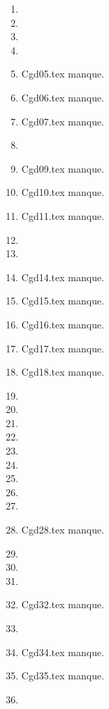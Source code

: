\clearpage 
{}
\begin{enumerate}
  \item  
  \item  
  \item  
  \item  
  \item Cgd05.tex manque. 
  \item Cgd06.tex manque. 
  \item Cgd07.tex manque. 
  \item  
  \item Cgd09.tex manque. 
  \item Cgd10.tex manque. 
  \item Cgd11.tex manque. 
  \item  
  \item  
  \item Cgd14.tex manque. 
  \item Cgd15.tex manque. 
  \item Cgd16.tex manque. 
  \item Cgd17.tex manque. 
  \item Cgd18.tex manque. 
  \item  
  \item  
  \item  
  \item  
  \item  
  \item  
  \item  
  \item  
  \item  
  \item Cgd28.tex manque. 
  \item  
  \item  
  \item  
  \item Cgd32.tex manque. 
  \item  
  \item Cgd34.tex manque. 
  \item Cgd35.tex manque. 
  \item  
\end{enumerate} 
